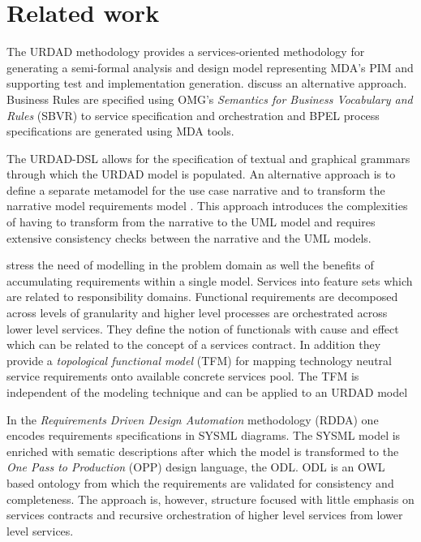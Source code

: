 \section{Related work \label{sec:relatedWork}}

The URDAD methodology provides a services-oriented methodology for generating a semi-formal analysis and design model representing MDA's PIM and supporting test and implementation generation. \cite{iacob_model-driven_2008} discuss an alternative approach. Business Rules are specified using OMG's {\em Semantics for Business Vocabulary and Rules} (SBVR) to service specification and orchestration and BPEL process specifications are generated using MDA tools. 

The URDAD-DSL allows for the specification of textual and graphical grammars through which the URDAD model is populated. An alternative approach is to define a separate metamodel for the use case narrative and to transform the narrative model requirements model \cite{hoffmann_towards_2009,osis_transforming_2010}. This approach introduces the complexities of having to transform from the narrative to the UML model and requires extensive consistency checks between the narrative and the UML models.

\cite{asnina_computation_2010} stress the need of modelling in the problem domain as well the benefits of accumulating requirements within a single model. Services into feature sets which are related to responsibility domains. Functional requirements are decomposed across levels of granularity and higher level processes are orchestrated across lower level services. They define the notion of functionals with cause and effect which can be related to the concept of a services contract. In addition they provide a {\em topological functional model} (TFM) for mapping technology neutral service requirements onto available concrete services pool. The TFM is independent of the modeling technique and can be applied to an URDAD model

In the {\em Requirements Driven Design Automation} methodology (RDDA) \cite{cardei_model_2008} one encodes requirements specifications in SYSML diagrams. The SYSML model is enriched with sematic descriptions after which the model is transformed to the {\em One Pass to Production} (OPP) design language, the ODL. ODL is an OWL based ontology from which the requirements are validated for consistency and completeness. The approach is, however, structure focused with little emphasis on services contracts and recursive orchestration of higher level services from lower level services.

